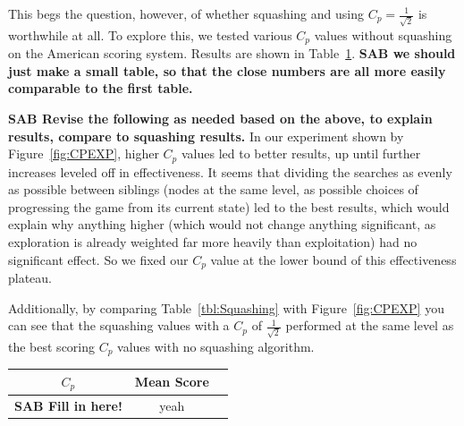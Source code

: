 \documentclass[letterpaper]{article}
\begin{document}
This begs the question, however, of whether squashing and using $C_p = \frac{1}{\sqrt{2}}$ is worthwhile at all. To explore this, we tested various $C_p$ values without squashing on the American scoring system. Results are shown in Table~\ref{tbl:noSquashing}. {\bf SAB we should just make a small table, so that the close numbers are all more easily comparable to the first table.}

{\bf SAB Revise the following as needed based on the above, to explain results, compare to squashing results.} In our experiment shown by Figure~\ref{fig:CPEXP}, higher $C_p$ values  led to better results, up until further increases leveled off in effectiveness. It seems that dividing the searches as evenly as possible between siblings (nodes at the same level, as possible choices of progressing the game from its current state) led to the best results, which would explain why anything higher (which would not change anything significant, as exploration is already weighted far more heavily than exploitation) had no significant effect. So we fixed our $C_p$ value at the lower bound of this effectiveness plateau.

Additionally, by comparing Table~\ref{tbl:Squashing} with Figure~\ref{fig:CPEXP} you can see that the squashing values with a  $C_p$ of $\frac{1}{\sqrt{2}}$ performed at the same level as the best scoring  $C_p$ values with no squashing algorithm. 

\begin{table}
\label{tbl:noSquashing}
\centering
\begin{tabular}{c c c}
\hline
$C_p$ & Mean Score \\
\hline
{\bf SAB Fill in here!} & yeah\\
\hline
\end{tabular}
\end{table}

\end{document}
